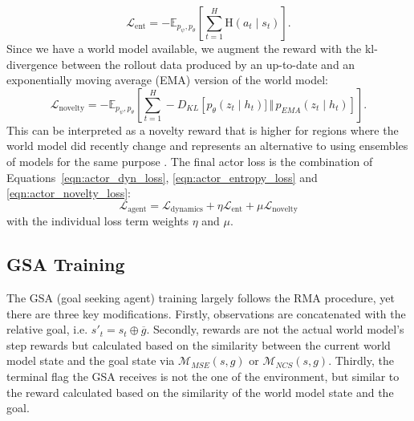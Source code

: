 \documentclass{article}
\DeclareMathOperator{\cond}{\vert}
\begin{document}
\begin{equation}\label{eqn:actor_entropy_loss}
    \mathcal{L}_{\text{ent}} = - \mathbb{E}_{p_\psi, p_\theta} \left[ \sum_{t=1}^{H} \mathrm{H}(a_t \cond s_t) \right].
\end{equation}
Since we have a world model available, we augment the reward with the kl-divergence between the rollout data produced by an up-to-date and an exponentially moving average (EMA) version of the world model:
\begin{equation}\label{eqn:actor_novelty_loss}
    \mathcal{L}_{\text{novelty}} =  - \mathbb{E}_{p_\psi, p_\theta} \left[ \sum_{t=1}^{H} - D_{KL}\left[ p_\theta(z_t \cond h_t)] \,\Vert\, p_{EMA}(z_t \cond h_t) \right] \right].
\end{equation}
This can be interpreted as a novelty reward that is higher for regions where the world model did recently change and represents an alternative to using ensembles of models for the same purpose \citep{chua2018deep}. The final actor loss is the combination of Equations~\ref{eqn:actor_dyn_loss}, \ref{eqn:actor_entropy_loss} and \ref{eqn:actor_novelty_loss}:
\begin{equation}
    \mathcal{L}_{\text{agent}} = \mathcal{L}_{\text{dynamics}} + \eta \mathcal{L}_{\text{ent}} + \mu \mathcal{L}_{\text{novelty}}
\end{equation}
with the individual loss term weights $\eta$ and $\mu$.

\subsection{GSA Training}

The GSA (goal seeking agent) training largely follows the RMA procedure, yet there are three key modifications. Firstly, observations are concatenated with the relative goal, i.e. $s'_t = s_t \oplus \overline{g}$. Secondly, rewards are not the actual world model's step rewards but calculated based on the similarity between the current world model state and the goal state via $\mathcal{M}_{MSE}(s, g)$ or $\mathcal{M}_{NCS}(s, g)$. Thirdly, the terminal flag the GSA receives is not the one of the environment, but similar to the reward calculated based on the similarity of the world model state and the goal.
\end{document}
